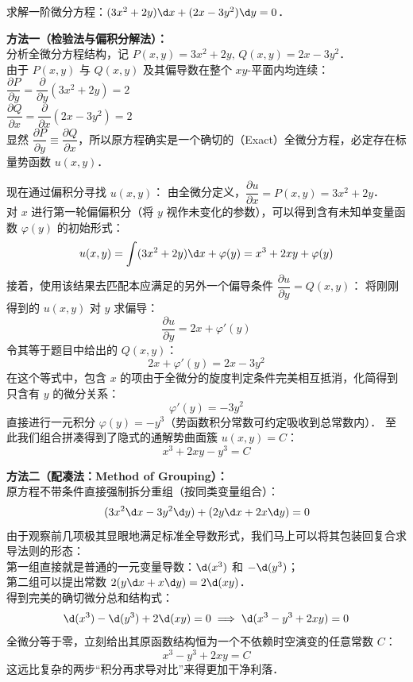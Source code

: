 \documentclass[12pt, a4paper, oneside, UTF8]{ctexbook}
\begin{document}
\begin{example}
    求解一阶微分方程：$(3x^2+2y)\d x + (2x-3y^2)\d y = 0$．
\end{example}
\begin{solution}
    \textbf{方法一（检验法与偏积分解法）：}\\
    分析全微分方程结构，记 $P(x,y) = 3x^2+2y,\, Q(x,y) = 2x-3y^2$．\\
    由于 $P(x,y)$ 与 $Q(x,y)$ 及其偏导数在整个 $xy$-平面内均连续：\\
    $\dfrac{\partial P}{\partial y} = \dfrac{\partial}{\partial y}(3x^2+2y) = 2$\\
    $\dfrac{\partial Q}{\partial x} = \dfrac{\partial}{\partial x}(2x-3y^2) = 2$\\
    显然 $\dfrac{\partial P}{\partial y} \equiv \dfrac{\partial Q}{\partial x}$，所以原方程确实是一个确切的（Exact）全微分方程，必定存在标量势函数 $u(x,y)$．

    现在通过偏积分寻找 $u(x,y)$：
    由全微分定义，$\dfrac{\partial u}{\partial x} = P(x,y) = 3x^2+2y$．\\
    对 $x$ 进行第一轮偏偏积分（将 $y$ 视作未变化的参数），可以得到含有未知单变量函数 $\varphi(y)$ 的初始形式：
    \[ u(x,y) = \int (3x^2+2y) \d x + \varphi(y) = x^3 + 2xy + \varphi(y) \]
    接着，使用该结果去匹配本应满足的另外一个偏导条件 $\dfrac{\partial u}{\partial y} = Q(x,y)$：
    将刚刚得到的 $u(x,y)$ 对 $y$ 求偏导：
    \[ \frac{\partial u}{\partial y} = 2x + \varphi'(y) \]
    令其等于题目中给出的 $Q(x,y)$：
    \[ 2x + \varphi'(y) = 2x - 3y^2 \]
    在这个等式中，包含 $x$ 的项由于全微分的旋度判定条件完美相互抵消，化简得到只含有 $y$ 的微分关系：
    \[ \varphi'(y) = -3y^2 \]
    直接进行一元积分 $\varphi(y) = -y^3$（势函数积分常数可约定吸收到总常数内）．
    至此我们组合拼凑得到了隐式的通解势曲面簇 $u(x,y) = C$：
    \[ \boxed{x^3 + 2xy - y^3 = C} \]

    \textbf{方法二（配凑法：Method of Grouping）：}\\
    原方程不带条件直接强制拆分重组（按同类变量组合）：\\
    \[ (3x^2\d x - 3y^2\d y) + (2y \d x + 2x \d y) = 0 \]
    由于观察前几项极其显眼地满足标准全导数形式，我们马上可以将其包装回复合求导法则的形态：\\
    第一组直接就是普通的一元变量导数：$\d(x^3)$ 和 $-\d(y^3)$；\\
    第二组可以提出常数 $2(y \d x + x \d y) = 2\d(xy)$．\\
    得到完美的确切微分总和结构式：
    \[ \d(x^3) - \d(y^3) + 2\d(xy) = 0 \implies \d(x^3 - y^3 + 2xy) = 0 \]
    全微分等于零，立刻给出其原函数结构恒为一个不依赖时空演变的任意常数 $C$：
    \[ \boxed{x^3 - y^3 + 2xy = C} \]
    这远比复杂的两步“积分再求导对比”来得更加干净利落．
\end{solution}
\end{document}
